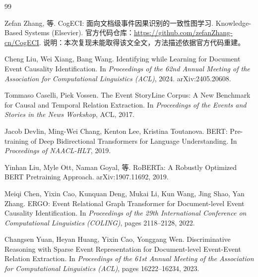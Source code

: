 \begin{thebibliography}{99}

Zefan Zhang, 等.
\newblock CogECI: 面向文档级事件因果识别的一致性图学习.
\newblock Knowledge-Based Systems (Elsevier).
\newblock 官方代码仓库：\url{https://github.com/zefanZhang-cn/CogECI}.
\newblock 说明：本次复现未能取得该文全文，方法描述依据官方代码重建。

Cheng Liu, Wei Xiang, Bang Wang.
\newblock Identifying while Learning for Document Event Causality Identification.
\newblock In \emph{Proceedings of the 62nd Annual Meeting of the Association for Computational
Linguistics (ACL)}, 2024.
\newblock arXiv:2405.20608.

Tommaso Caselli, Piek Vossen.
\newblock The Event StoryLine Corpus: A New Benchmark for Causal and Temporal Relation Extraction.
\newblock In \emph{Proceedings of the Events and Stories in the News Workshop}, ACL, 2017.

Jacob Devlin, Ming-Wei Chang, Kenton Lee, Kristina Toutanova.
\newblock BERT: Pre-training of Deep Bidirectional Transformers for Language Understanding.
\newblock In \emph{Proceedings of NAACL-HLT}, 2019.

Yinhan Liu, Myle Ott, Naman Goyal, 等.
\newblock RoBERTa: A Robustly Optimized BERT Pretraining Approach.
\newblock arXiv:1907.11692, 2019.

Meiqi Chen, Yixin Cao, Kunquan Deng, Mukai Li, Kun Wang, Jing Shao, Yan Zhang.
\newblock ERGO: Event Relational Graph Transformer for Document-level Event Causality Identification.
\newblock In \emph{Proceedings of the 29th International Conference on Computational Linguistics
(COLING)}, pages 2118--2128, 2022.

Changsen Yuan, Heyan Huang, Yixin Cao, Yonggang Wen.
\newblock Discriminative Reasoning with Sparse Event Representation for Document-level
Event-Event Relation Extraction.
\newblock In \emph{Proceedings of the 61st Annual Meeting of the Association for Computational
Linguistics (ACL)}, pages 16222--16234, 2023.

\end{thebibliography}
